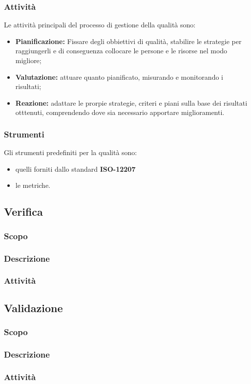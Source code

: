         \subsubsection{Attività}
        Le attività principali del processo di gestione della qualità sono:
        \begin{itemize}
            \item \textbf{Pianificazione: } Fissare degli obbiettivi di qualità, stabilire le strategie per raggiungerli e di conseguenza collocare le persone e le risorse nel modo migliore;
            \item \textbf{Valutazione: }attuare quanto pianificato, misurando e monitorando i risultati;
            \item \textbf{Reazione: } adattare le prorpie strategie, criteri e piani sulla base dei risultati otttenuti, comprendendo dove sia necessario apportare miglioramenti.
        \end{itemize}
        \subsubsection{Strumenti}
        Gli strumenti predefiniti per la qualità sono:
        \begin{itemize}
            \item quelli forniti dallo standard \textbf{ISO-12207} %
            \item le metriche.
        \end{itemize}
    \subsection{Verifica}
        \subsubsection{Scopo}
        \subsubsection{Descrizione}
        \subsubsection{Attività}
    \subsection{Validazione}
        \subsubsection{Scopo}
        \subsubsection{Descrizione}
        \subsubsection{Attività}